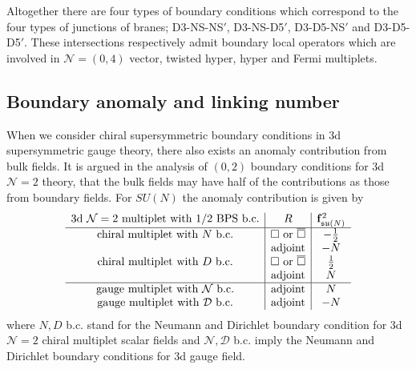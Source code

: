 \documentclass{article}
\numberwithin{equation}{section}
\begin{document}
Altogether there are four types of boundary conditions which 
correspond to the four types of junctions of branes; 
D3-NS-NS$'$, D3-NS-D5$'$, D3-D5-NS$'$ and D3-D5-D5$'$. 
These intersections respectively admit boundary local operators 
which are involved in $\mathcal{N}=(0,4)$ vector, twisted hyper, hyper and Fermi multiplets. 










\subsection{Boundary anomaly and linking number}
\label{sec_bdyanomaly}
When we consider chiral supersymmetric boundary conditions in 3d supersymmetric gauge theory, 
there also exists an anomaly contribution from bulk fields. 
It is argued in the analysis \cite{Dimofte:2017tpi} 
of $(0,2)$ boundary conditions for 3d $\mathcal{N}=2$ theory,
that the bulk fields may have half of the contributions as those from boundary fields.  
For $SU(N)$ the anomaly contribution is given by
\begin{align}
\label{t_Anom_bc1}
\begin{array}{c|c|c}
\textrm{3d $\mathcal{N}=2$ multiplet with $1/2$ BPS b.c.}&R&{\bf f}^{2}_{\mathfrak{su}(N)} \\  \hline 
\textrm{chiral multiplet with $N$ b.c.}&\textrm{$\Box$ or $\overline{\Box}$} &-\frac12 \\
& \textrm{adjoint}& -N\\ 
\textrm{chiral multiplet with $D$ b.c.}&\textrm{$\Box$ or $\overline{\Box}$}& \frac12 \\ 
&\textrm{adjoint}& N\\ \hline
\textrm{gauge multiplet with $\mathcal{N}$ b.c.}&\textrm{adjoint}& N\\ 
\textrm{gauge multiplet with $\mathcal{D}$ b.c.}&\textrm{adjoint}& -N\\
\end{array}
\end{align}
where $N, D$ b.c. stand for the Neumann and Dirichlet boundary condition for 
3d $\mathcal{N}=2$ chiral multiplet scalar fields and 
$\mathcal{N}, \mathcal{D}$ b.c. imply the Neumann and Dirichlet  boundary conditions for 3d gauge field. 
\end{document}
